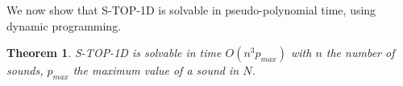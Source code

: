 \documentclass[a4paper]{book}
\newtheorem{theorem}{Theorem}[chapter]
\newcommand{\statoned}{{\sc S-TOP-1D }}
\begin{document}
We now show that \statoned is solvable in pseudo-polynomial time, using dynamic programming. 



\begin{theorem}
\statoned is solvable in time $O(n^3p_{max})$ with $n$ the number of sounds, $p_{max}$ the maximum value of a sound in $N$.
\end{theorem}
\end{document}
